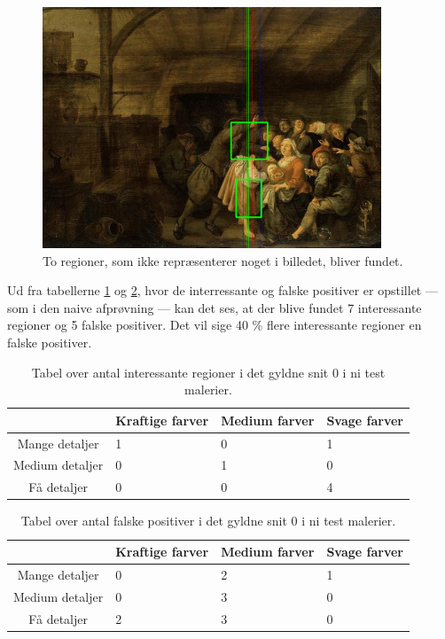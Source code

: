 \begin{figure}[h!!]
	\begin{center}
		\includegraphics[width=0.9\textwidth,angle=0]{afsnit/afprovning/billeder/udvidet_losning/udvidet_sfarver_mdetaljer.png}
	\end{center}
	\caption[]{To regioner, som ikke repræsenterer noget i billedet, bliver fundet.}
	\label{udvidet_virker_ikke3}
\end{figure}


Ud fra tabellerne \ref{udvidet_good} og \ref{udvidet_bad}, hvor de
interressante og falske positiver er opstillet --- som i den naive
afprøvning --- kan det ses, at der blive fundet 7 interessante regioner og 5
falske positiver. Det vil sige 40 \% flere interessante regioner en falske
positiver.

\begin{table}[H]
    \centering
    \begin{tabular}{|c|l|l|l|}
	\hline
           				& Kraftige farver & Medium farver & Svage farver \\\hline
		Mange detaljer	& 1 & 0 & 1 \\\hline
        Medium detaljer & 0 & 1 & 0 \\\hline
        Få detaljer     & 0 & 0 & 4 \\\hline
    \end{tabular}
    \caption[]{Tabel over antal interessante regioner i det gyldne snit 0 i ni test malerier.}
    \label{udvidet_good}
\end{table}

\begin{table}[H]
    \centering
    \begin{tabular}{|c|l|l|l|}
		\hline
            & Kraftige farver & Medium farver & Svage farver \\\hline
		Mange detaljer	& 0 & 2 & 1 \\\hline
        Medium detaljer  & 0 & 3 & 0 \\\hline
        Få detaljer     & 2 & 3 & 0 \\\hline
    \end{tabular}
    \caption[]{Tabel over antal falske positiver i det gyldne snit 0 i ni test malerier.}
    \label{udvidet_bad}
\end{table}
\clearpage

